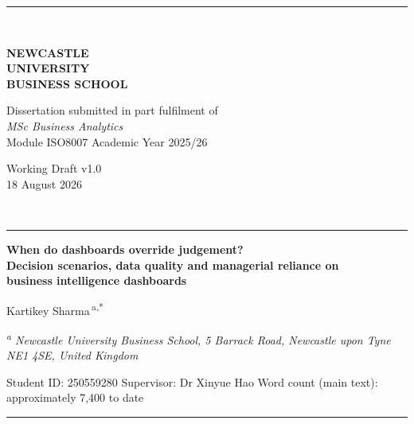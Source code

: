 \documentclass[11pt,a4paper]{article}
\numberwithin{figure}{section}
\numberwithin{table}{section}
\begin{document}
\thispagestyle{empty}
\begin{center}
{\color{rulegrey}\rule{\textwidth}{0.8pt}}\\[3pt]
\begin{minipage}{0.30\textwidth}\centering
{\footnotesize\sffamily\color{nublue}\textbf{NEWCASTLE}\\\textbf{UNIVERSITY}\\\textbf{BUSINESS SCHOOL}}
\end{minipage}%
\begin{minipage}{0.44\textwidth}\centering
{\footnotesize Dissertation submitted in part fulfilment of}\\[2pt]
{\large\itshape MSc Business Analytics}\\[3pt]
{\footnotesize Module ISO8007 \textbullet{} Academic Year 2025/26}
\end{minipage}%
\begin{minipage}{0.24\textwidth}\centering
{\footnotesize\color{nugrey} Working Draft v1.0\\ 18 August 2026}
\end{minipage}\\[3pt]
{\color{rulegrey}\rule{\textwidth}{0.8pt}}
\end{center}

\vspace{10pt}
{\LARGE\bfseries When do dashboards override judgement?\\[3pt]
Decision scenarios, data quality and managerial reliance on\\[3pt] business intelligence dashboards\par}

\vspace{10pt}
{\large Kartikey Sharma\,\textsuperscript{a,*}\par}
\vspace{3pt}
{\footnotesize\itshape \textsuperscript{a} Newcastle University Business School, 5 Barrack Road, Newcastle upon Tyne NE1 4SE, United Kingdom\par}
\vspace{2pt}
{\footnotesize Student ID: 250559280 \quad\textbullet\quad Supervisor: Dr Xinyue Hao \quad\textbullet\quad Word count (main text): approximately 7,400 to date\par}

\vspace{12pt}
{\color{rulegrey}\rule{\textwidth}{0.5pt}}
\vspace{6pt}
\end{document}
